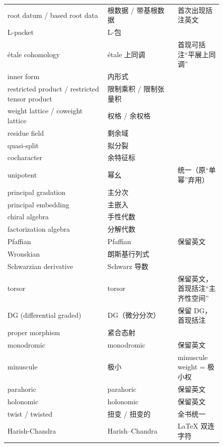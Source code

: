 \begin{longtable}{p{0.40\linewidth}p{0.28\linewidth}p{0.18\linewidth}}
root datum / based root data & 根数据 / 带基根数据 & 首次出现括注英文 \\
L-packet & L-包 &  \\
étale cohomology & étale 上同调 & 首现可括注“平展上同调” \\
inner form & 内形式 &  \\
restricted product / restricted tensor product & 限制乘积 / 限制张量积 &  \\
weight lattice / coweight lattice & 权格 / 余权格 &  \\
residue field & 剩余域 &  \\
quasi-split & 拟分裂 &  \\
cocharacter & 余特征标 &  \\
unipotent & 幂幺 & 统一（原“单幂”弃用） \\
principal gradation & 主分次 &  \\
principal embedding & 主嵌入 &  \\
chiral algebra & 手性代数 &  \\
factorization algebra & 分解代数 &  \\
Pfaffian & Pfaffian & 保留英文 \\
Wronskian & 朗斯基行列式 &  \\
Schwarzian derivative & Schwarz 导数 &  \\
torsor & torsor & 保留英文，首现括注“主齐性空间” \\
DG (differential graded) & DG（微分分次） & 保留 DG，首现括注 \\
proper morphism & 紧合态射 &  \\
monodromic & monodromic & 保留英文 \\
minuscule & 极小 & minuscule weight = 极小权 \\
parahoric & parahoric & 保留英文 \\
holonomic & holonomic & 保留英文 \\
twist / twisted & 扭变 / 扭变的 & 全书统一 \\
Harish-Chandra & Harish--Chandra & LaTeX 双连字符 \\
\bottomrule
\end{longtable}
